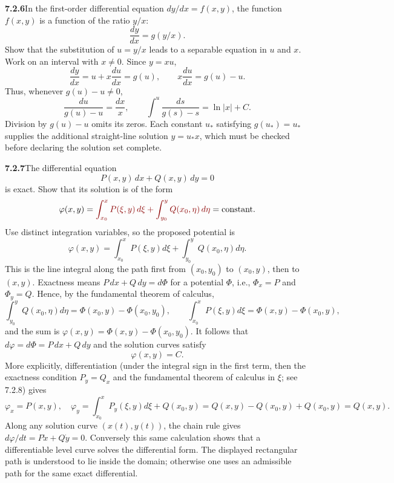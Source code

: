 \par\bigskip
\noindent\textbf{7.2.6}\quad In the first-order differential equation
$dy/dx=f(x,y)$, the function $f(x,y)$ is a function of the ratio $y/x$:
\[
\frac{dy}{dx}=g(y/x).
\]
Show that the substitution of $u=y/x$ leads to a separable equation in $u$ and
$x$.
\solution
Work on an interval with $x\ne0$. Since $y=xu$,
\[
\frac{dy}{dx}=u+x\frac{du}{dx}=g(u),\qquad
x\frac{du}{dx}=g(u)-u.
\]
Thus, whenever $g(u)-u\ne0$,
\[
\boxed{\frac{du}{g(u)-u}=\frac{dx}{x}},\qquad
\int^u\frac{ds}{g(s)-s}=\ln|x|+C.
\]
Division by $g(u)-u$ omits its zeros. Each constant $u_*$ satisfying
$g(u_*)=u_*$ supplies the additional straight-line solution $y=u_*x$,
which must be checked before declaring the solution set complete.

\par\bigskip
\noindent\textbf{7.2.7}\quad The differential equation
\[
P(x,y)\,dx+Q(x,y)\,dy=0
\]
is exact.  Show that its solution is of the form
\[
\varphi(x,y)=\erratum{\int_{x_{0}}^{x}P(\xi,y)\,d\xi+\int_{y_{0}}^{y}Q(x_{0},\eta)\,d\eta}
=\text{constant}.
\]
\solution
Use distinct integration variables, so the proposed potential is
\[
\varphi(x,y)=\int_{x_0}^xP(\xi,y)d\xi
             +\int_{y_0}^yQ(x_0,\eta)d\eta.
\]
This is the line integral along the path first from $(x_0,y_0)$ to
$(x_0,y)$, then to $(x,y)$. Exactness means $P\,dx+Q\,dy=d\Phi$
for a potential $\Phi$, i.e., $\Phi_x=P$ and $\Phi_y=Q$. Hence, by the
fundamental theorem of calculus,
\[
\int_{y_0}^yQ(x_0,\eta)d\eta=\Phi(x_0,y)-\Phi(x_0,y_0),\qquad
\int_{x_0}^xP(\xi,y)d\xi=\Phi(x,y)-\Phi(x_0,y),
\]
and the sum is $\varphi(x,y)=\Phi(x,y)-\Phi(x_0,y_0)$. It follows that
$d\varphi=d\Phi=P\,dx+Q\,dy$ and the solution curves satisfy
\[
\boxed{\varphi(x,y)=C}.
\]
More explicitly, differentiation (under the integral sign in the first
term, then the exactness condition $P_y=Q_x$ and the fundamental theorem
of calculus in $\xi$; see 7.2.8) gives
\[
\varphi_x=P(x,y),\quad
\varphi_y=\int_{x_0}^xP_y(\xi,y)d\xi+Q(x_0,y)
=Q(x,y)-Q(x_0,y)+Q(x_0,y)=Q(x,y).
\]
Along any solution curve $(x(t),y(t))$, the chain rule gives
$d\varphi/dt=P\dot x+Q\dot y=0$. Conversely this same calculation
shows that a differentiable level curve solves the differential form.
The displayed rectangular path is understood to lie inside the domain;
otherwise one uses an admissible path for the same exact differential.

